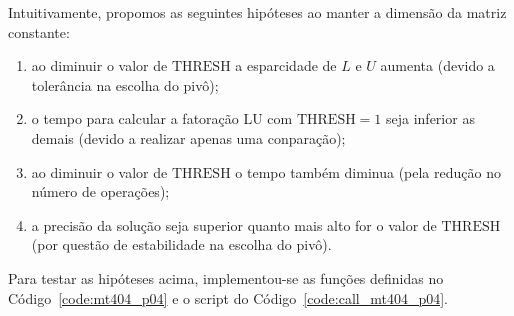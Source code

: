 \documentclass[12pt,a4paper]{article}
\begin{document}
Intuitivamente, propomos as seguintes hipóteses ao manter a dimensão da matriz
constante:
\begin{enumerate}
    \item ao diminuir o valor de $\mathrm{THRESH}$ a esparcidade de $L$ e $U$
        aumenta (devido a toler\^{a}ncia na escolha do piv\^{o});
        \label{hip:esp}
    \item o tempo para calcular a fatora\c{c}\~{a}o LU com $\mathrm{THRESH} = 1$
        seja inferior as demais (devido a realizar apenas uma conparação);
        \label{hip:thres1}
    \item ao diminuir o valor de $\mathrm{THRESH}$ o tempo tamb\'{e}m diminua
        (pela redu\c{c}\~{a}o no n\'{u}mero de opera\c{c}\~{o}es);
        \label{hip:tempo}
    \item a precis\~{a}o da solu\c{c}\~{a}o seja superior quanto mais alto for o
        valor de $\mathrm{THRESH}$ (por questão de estabilidade na escolha do
        pivô). \label{hip:est}
\end{enumerate}

Para testar as hipóteses acima, implementou-se as funções definidas no
Código~\ref{code:mt404_p04} e o script do Código~\ref{code:call_mt404_p04}.
\end{document}
